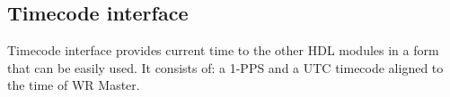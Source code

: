 \subsection{Timecode interface}
\label{sec:wrpc_timecode}


Timecode interface provides current time to the other HDL modules in a form that
can be easily used. It consists of: a 1-PPS and a UTC timecode
aligned to the time of WR Master.

